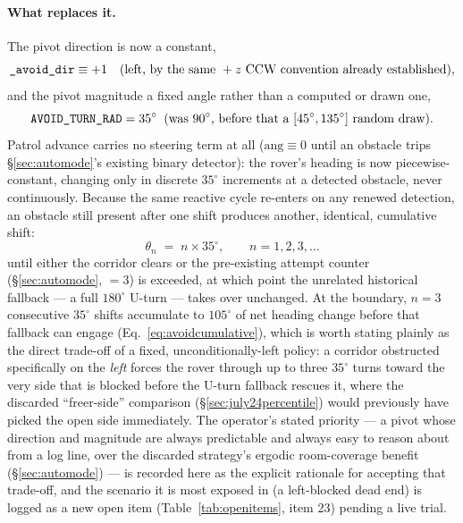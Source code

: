 \paragraph{What replaces it.} The pivot direction is now a constant,
\begin{equation}
\code{\_avoid\_dir} \equiv +1 \quad(\text{left, by the same}\ +z\ \text{CCW convention already established}),
\label{eq:avoiddir}
\end{equation}
and the pivot magnitude a fixed angle rather than a computed or drawn one,
\begin{equation}
\code{AVOID\_TURN\_RAD} = 35^\circ \;\;(\text{was } 90^\circ\text{, before that a } [45^\circ,135^\circ]\text{ random draw}).
\label{eq:avoidfixed}
\end{equation}
Patrol advance carries no steering term at all ($\text{ang}\equiv0$ until
an obstacle trips \S\ref{sec:automode}'s existing binary detector): the
rover's heading is now piecewise-constant, changing only in discrete
$35^\circ$ increments at a detected obstacle, never continuously. Because
the same reactive cycle re-enters  on any renewed
detection, an obstacle still present after one shift produces another,
identical, cumulative shift:
\begin{equation}
\theta_n \;=\; n \times 35^\circ, \qquad n = 1, 2, 3, \dots
\label{eq:avoidcumulative}
\end{equation}
until either the corridor clears or the pre-existing attempt counter
(\S\ref{sec:automode}, $=3$) is exceeded, at which
point the unrelated historical fallback — a full $180^\circ$ U-turn — takes
over unchanged. At the boundary, $n=3$ consecutive $35^\circ$ shifts
accumulate to $105^\circ$ of net heading change before that fallback can
engage (Eq.~\ref{eq:avoidcumulative}), which is worth stating plainly as
the direct trade-off of a fixed, unconditionally-left policy: a corridor
obstructed specifically on the \emph{left} forces the rover through up to
three $35^\circ$ turns toward the very side that is blocked before the
U-turn fallback rescues it, where the discarded ``freer-side'' comparison
(\S\ref{sec:july24percentile}) would previously have picked the open side
immediately. The operator's stated priority — a pivot whose direction and
magnitude are always predictable and always easy to reason about from a
log line, over the discarded strategy's ergodic room-coverage benefit
(\S\ref{sec:automode}) — is recorded here as the explicit rationale for
accepting that trade-off, and the scenario it is most exposed in (a
left-blocked dead end) is logged as a new open item
(Table~\ref{tab:openitems}, item 23) pending a live trial.

